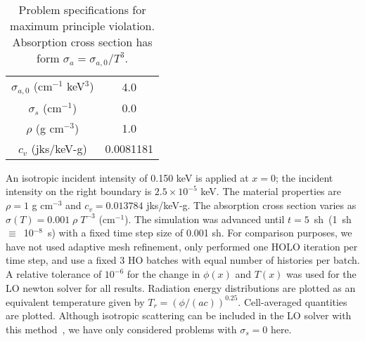\begin{table}[H]
        \caption{\label{tab:mpv_prob}Problem specifications for maximum principle
        violation. Absorption cross section has form $\sigma_a = \sigma_{a,0}/T^3$.}
\centering
        \begin{tabular}{|c|c|} \hline
            $\sigma_{a,0}$ (cm$^{-1}$ keV$^3$)  & 4.0  \\ 
            $\sigma_s$ (cm$^{-1}$) & 0.0 \\
            $\rho$ (g cm$^{-3}$) & 1.0  \\
            $c_v$ (jks/keV-g) & 0.0081181  \\ \hline
        \end{tabular}
\end{table}



   An isotropic incident intensity of 0.150 keV is applied
at $x=0$; the incident intensity on the right boundary is $2.5\times10^{-5}$ keV.
The material properties are $\rho = 1$ g cm$^{-3}$ and $c_v = 0.013784$ jks/keV-g. The
absorption cross section varies as $\sigma(T) = 0.001\;\rho\; T^{-3}$ (cm$^{-1}$).
The simulation was advanced until $t=5$~sh~(1~sh~$\equiv$~10$^{-8}$~s) with a fixed time step size of 0.001 sh. For comparison purposes, we
have not used adaptive mesh
refinement, only performed one HOLO iteration per time
step, and use a fixed 3 HO batches with equal number of histories per batch. A
relative tolerance of $10^{-6}$ for the change in $\phi(x)$ and $T(x)$ was used for
the LO newton solver for all results. Radiation energy
distributions are plotted as an equivalent temperature given by
$T_r=(\phi/(ac))^{0.25}$.  Cell-averaged quantities are plotted.
Although isotropic scattering can be included in the LO solver with this method~\cite{ans_2014}, we have only
considered problems with $\sigma_s = 0$ here.  
